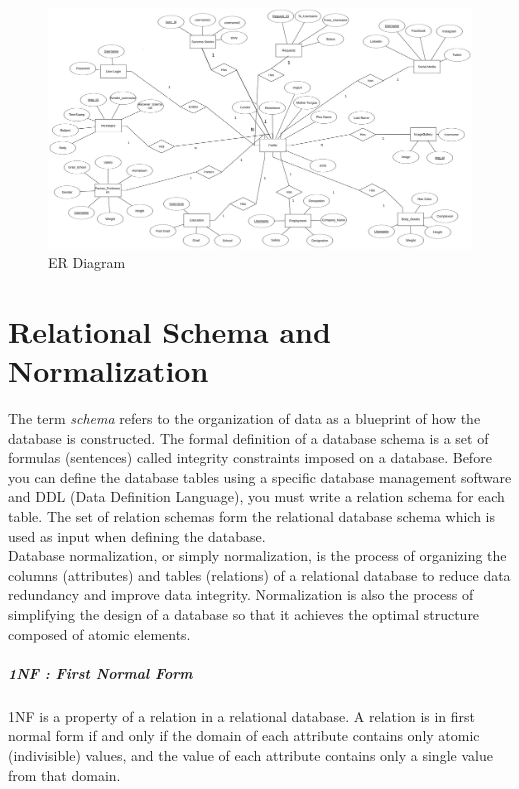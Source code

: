 \documentclass[12pt]{report}
\begin{document}
\begin{figure}[!htb]
    \centering
    \includegraphics[width=1.3\textwidth, angle = 270]{ER.png}
    \caption{ER Diagram}
    \label{fig:ER Diagram}
\end{figure}





\chapter{Relational Schema and Normalization}
The term \emph{schema} refers to the organization of data as a blueprint of how the database is constructed. The formal definition of a database schema is a set of formulas (sentences) called integrity constraints imposed on a database. Before you can define the database tables using a specific database management software and DDL (Data Definition Language), you must write a relation schema for each table. The set of relation schemas form the relational database schema which is used as input when defining the database.\\

Database normalization, or simply normalization, is the process of organizing the columns (attributes) and tables (relations) of a relational database to reduce data redundancy and improve data integrity. Normalization is also the process of simplifying the design of a database so that it achieves the optimal structure composed of atomic elements. 

\paragraph*{1NF : First Normal Form}
1NF is a property of a relation in a relational database. A relation is in first normal form if and only if the domain of each attribute contains only atomic (indivisible) values, and the value of each attribute contains only a single value from that domain.
\end{document}
